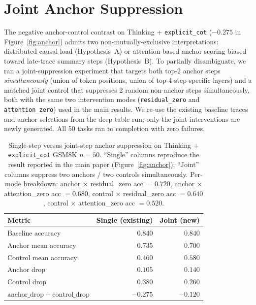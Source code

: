 \documentclass{article}
\theoremstyle{plain}
\theoremstyle{definition}
\theoremstyle{remark}
\begin{document}
\section{Joint Anchor Suppression}
\label{app:joint-anchor}

The negative anchor-control contrast on Thinking + \texttt{explicit\_cot}
($-0.275$ in Figure~\ref{fig:anchor}) admits two non-mutually-exclusive
interpretations: distributed causal load (Hypothesis~A) or
attention-based anchor scoring biased toward late-trace summary steps
(Hypothesis~B). To partially disambiguate, we ran a joint-suppression
experiment that targets both top-2 anchor steps \emph{simultaneously}
(union of token positions, union of top-4 step-specific layers) and a
matched joint control that suppresses 2 random non-anchor steps
simultaneously, both with the same two intervention modes
(\texttt{residual\_zero} and \texttt{attention\_zero}) used in the main
results. We re-use the existing baseline traces and anchor selections
from the deep-table run; only the joint interventions are newly
generated. All 50 tasks ran to completion with zero failures.

\begin{table}[!htbp]
\centering
\small
\setlength{\tabcolsep}{4pt}
\begin{tabular}{@{}lrr@{}}
\toprule
Metric & Single (existing) & Joint (new) \\
\midrule
Baseline accuracy             & $0.840$ & $0.840$ \\
Anchor mean accuracy          & $0.735$ & $0.700$ \\
Control mean accuracy         & $0.460$ & $0.580$ \\
\midrule
Anchor drop                   & $0.105$ & $0.140$ \\
Control drop                  & $0.380$ & $0.260$ \\
$\mathrm{anchor\_drop} - \mathrm{control\_drop}$ & $-0.275$ & $-0.120$ \\
\bottomrule
\end{tabular}
\caption{Single-step versus joint-step anchor suppression on
Thinking + \texttt{explicit\_cot} GSM8K $n{=}50$. ``Single'' columns
reproduce the result reported in the main paper (Figure~\ref{fig:anchor});
``Joint'' columns suppress two anchors / two controls simultaneously.
Per-mode breakdown: anchor $\times$ residual\_zero acc $=0.720$,
anchor $\times$ attention\_zero acc $=0.680$, control $\times$
residual\_zero acc $=0.640$, control $\times$ attention\_zero acc
$=0.520$.}
\label{tab:joint-anchor}
\end{table}
\end{document}
